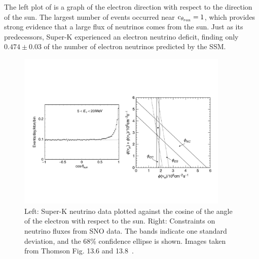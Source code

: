 The left plot of  is a graph of the electron 
direction with respect to the
direction of the sun. The largest number of events occurred near 
$\operatorname{c}_{\theta_{\rm sun}}=1$,
which provides strong evidence that a large flux of neutrinos comes from the
sun. Just as its predecessors, Super-K experienced an electron neutrino
deficit, finding only $0.474\pm0.03$ of the number of electron neutrinos
predicted by the SSM.

\begin{figure}
  \centering
  \vspace{-20mm}
  \includegraphics[width=0.9\textwidth,keepaspectratio]
                {pictures/t13_6&8.pdf}
  \vspace*{-20mm}
  \caption{Left: Super-K neutrino data plotted against the cosine of the
           angle of the electron with respect to the sun. Right: Constraints
           on neutrino fluxes from SNO data. The bands indicate one standard
           deviation, and the 68\% confidence ellipse is shown. Images taken
           from Thomson Fig. 13.6 and 13.8~\cite{thomson_modern_2013}.}
  \label{fig:superKdata}
\end{figure}

